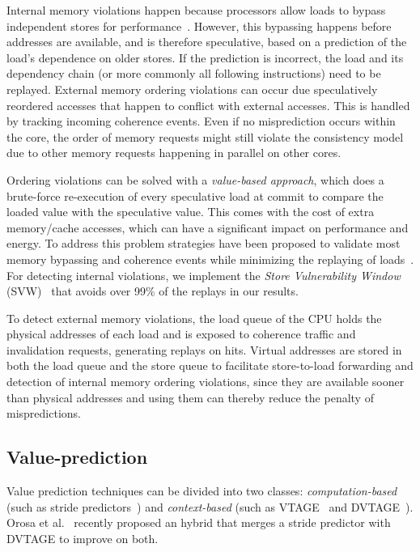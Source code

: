 \documentclass{sig-alternate}
\begin{document}
Internal memory violations happen because processors allow loads to bypass independent stores for performance~\cite{MD/chrysos1998memory, MD/kessler1999alpha, MD/moshovos1997dynamic}. However, this bypassing happens before addresses are available, and is therefore speculative, based on a prediction of the load's dependence on older stores.  If the prediction is incorrect, the load and its dependency chain (or more commonly all following instructions) need to be replayed. External memory ordering violations can occur due speculatively reordered accesses that happen to conflict with external accesses. This is handled by tracking incoming coherence events. Even if no misprediction occurs within the core, the order of memory requests might still violate the consistency model due to other memory requests happening in parallel on other cores.

Ordering violations can be solved with a \emph{value-based approach}, which does a brute-force re-execution of every speculative load at commit to compare the loaded value with the speculative value. This comes with the cost of extra memory/cache accesses, which can have a significant impact on performance and energy. 
To address this problem strategies have been proposed to validate most memory bypassing and coherence events while minimizing the replaying of loads~\cite{RS/petric02three, MD/onder2001load, MD/sodani1997dynamic}. For detecting internal violations, we implement the \textit{Store Vulnerability Window} (SVW)~\cite{SVW/roth05} that avoids over 99\% of the replays in our results. 

To detect external memory violations, the load queue of the CPU holds the physical addresses of each load and is exposed to coherence traffic and invalidation requests, generating replays on hits. Virtual addresses are stored in both the load queue and the store queue to facilitate store-to-load forwarding and detection of internal memory ordering violations, since they are available sooner than physical addresses and using them can thereby reduce the penalty of mispredictions.     

\subsection{Value-prediction}
Value prediction techniques can be divided into two classes: \textit{computation-based} (such as stride predictors~\cite{SP/eickemeyer93load, SP/gabbay96speculative}) and \textit{context-based} (such as VTAGE~\cite{VP/perais2014VTAGE} and DVTAGE~\cite{VP/perais15bebop}). Orosa et al.~\cite{AVPP/orosa18} recently proposed an hybrid that merges a stride predictor with DVTAGE to improve on both.   
\end{document}
